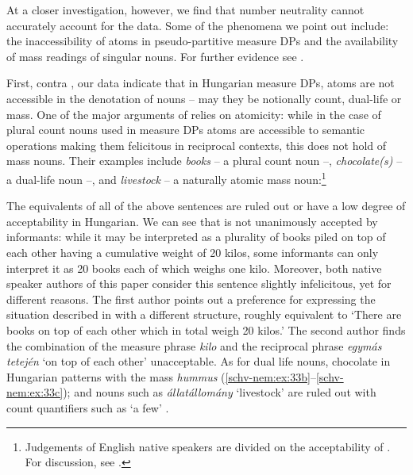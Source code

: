 \documentclass[output=paper]{langscibook}
\begin{document}
At a closer investigation, however, we find that number neutrality cannot accurately account for the data. Some of the phenomena we point out include: the inaccessibility of atoms in pseudo-partitive measure DPs and the availability of mass readings of singular nouns.  For further evidence see \citet{schvarcz-nemes-19}.

First, contra \citet{erbach-etal-19}, our data indicate that in Hungarian measure DPs, atoms are not accessible in the denotation of nouns -- may they be notionally count, dual-life or mass.  One of the major arguments of \citet{erbach-etal-19} relies on atomicity: while in the case of plural count nouns used in measure DPs atoms are accessible to semantic operations making them felicitous in reciprocal contexts, this does not hold of mass nouns. Their examples include \textit{books} -- a plural count noun --, \textit{chocolate(s)} -- a dual-life noun --, and \textit{livestock} -- a naturally atomic mass noun:\footnote{Judgements of English native speakers are divided on the acceptability of . For discussion, see \citet{erbach-etal-19}. } 

\ea \label{schv-nem:ex:32}
\label{schv-nem:ex:32a}
\label{schv-nem:ex:32b}
 \label{schv-nem:ex:32c}
\label{schv-nem:ex:32d}
\z
\z

\noindent The equivalents of all of the above sentences are ruled out or have a low degree of acceptability in Hungarian. We can see that  is not unanimously accepted by informants: while it may be interpreted as a plurality of books piled on top of each other having a cumulative weight of 20 kilos, some informants can only interpret it as 20 books each of which weighs one kilo. Moreover, both native speaker authors of this paper consider this sentence slightly infelicitous, yet for different reasons. The first author points out a preference for expressing the situation described in  with a different structure, roughly equivalent to `There are books on top of each other which in total weigh 20 kilos.' The second author finds the combination of the measure phrase \textit{kilo} and the reciprocal phrase \textit{egymás tetején} `on top of each other' unacceptable. As for dual life nouns, chocolate in Hungarian patterns with the mass \textit{hummus}  (\ref{schv-nem:ex:33b}--\ref{schv-nem:ex:33c}); and nouns such as \textit{állatállomány} `livestock' are ruled out with count quantifiers such as ‘a few’ .
\end{document}
